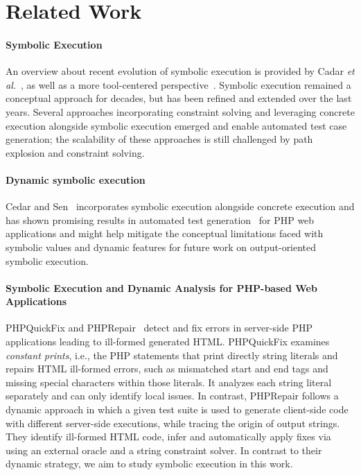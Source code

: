 \section{Related Work} \label{sec:related_work}

\paragraph{Symbolic Execution}
An overview about recent evolution of symbolic execution is provided
by Cadar {\em et al.}~\cite{CadarSen2013}, as well as a more
tool-centered perspective~\cite{Cadar2011}.
%
Symbolic execution \cite{King1976,Darringer1978} remained a
conceptual approach for decades, but has been refined and extended
over the last years. Several approaches incorporating constraint
solving and leveraging concrete execution alongside symbolic execution
emerged and enable automated test case generation; the scalability of
these approaches is still challenged by path explosion and constraint
solving.

\paragraph{Dynamic symbolic execution} Cedar and Sen~\cite{CadarSen2013} incorporates symbolic execution
alongside concrete execution and has shown promising results in
automated test
generation~\cite{artzi_finding_2008,artzi_finding_2010,DynamicWassermann}
for PHP web applications and might help mitigate the conceptual
limitations faced with symbolic values and dynamic features for future
work on output-oriented symbolic execution.

\paragraph{Symbolic Execution and Dynamic Analysis for PHP-based Web Applications}
PHPQuickFix and PHPRepair~\cite{ibm-icse12} detect and fix errors in
server-side PHP applications leading to ill-formed generated HTML.
PHPQuickFix examines {\em constant prints}, i.e., the PHP statements
that print directly string literals and repairs HTML ill-formed
errors, such as mismatched start and end tags and missing special
characters within those literals. It analyzes each string literal
separately and can only identify local issues. In contrast, PHPRepair
follows a dynamic approach in which a given test suite is used to
generate client-side code with different server-side executions, while
tracing the origin of output strings.
They identify ill-formed HTML code, infer and automatically apply
fixes via using an external oracle and a string constraint solver.  In
contrast to their dynamic strategy, we aim to study symbolic execution
in this work.

